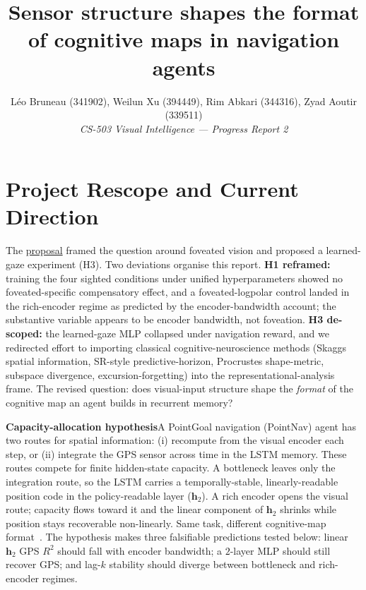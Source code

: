 \documentclass[10pt,conference,compsocconf]{IEEEtran}
\begin{document}
\title{\vspace{-8pt}Sensor structure shapes the format of cognitive maps in navigation agents\vspace{-12pt}}

\author{
  Léo Bruneau (341902), Weilun Xu (394449), Rim Abkari (344316), Zyad Aoutir (339511)\\
  \textit{CS-503 Visual Intelligence --- Progress Report 2}
}

\maketitle

\section{Project Rescope and Current Direction}

The \href{https://raw.githubusercontent.com/alunxu/cs503-proposal/main/How_Foveated_Vision_Shapes_Cognitive_Maps_in_Navigation_Agents.pdf}{proposal} framed the question around foveated vision and proposed a learned-gaze experiment (H3). Two deviations organise this report. \textbf{H1 reframed:} training the four sighted conditions under unified hyperparameters showed no foveated-specific compensatory effect, and a foveated-logpolar control landed in the rich-encoder regime as predicted by the encoder-bandwidth account; the substantive variable appears to be encoder bandwidth, not foveation. \textbf{H3 de-scoped:} the learned-gaze MLP collapsed under navigation reward, and we redirected effort to importing classical cognitive-neuroscience methods (Skaggs spatial information, SR-style predictive-horizon, Procrustes shape-metric, subspace divergence, excursion-forgetting) into the representational-analysis frame. The revised question: does visual-input structure shape the \emph{format} of the cognitive map an agent builds in recurrent memory?

\noindent\textbf{Capacity-allocation hypothesis}\quad A PointGoal navigation (PointNav) agent has two routes for spatial information: (i) recompute from the visual encoder each step, or (ii) integrate the GPS sensor across time in the LSTM memory. These routes compete for finite hidden-state capacity. A bottleneck leaves only the integration route, so the LSTM carries a temporally-stable, linearly-readable position code in the policy-readable layer ($\mathbf{h}_2$). A rich encoder opens the visual route; capacity flows toward it and the linear component of $\mathbf{h}_2$ shrinks while position stays recoverable non-linearly. Same task, different cognitive-map format~\cite{banino2018grid,cueva2018grid}. The hypothesis makes three falsifiable predictions tested below: linear $\mathbf{h}_2$ GPS $R^2$ should fall with encoder bandwidth; a $2$-layer MLP should still recover GPS; and lag-$k$ stability should diverge between bottleneck and rich-encoder regimes.
\end{document}
